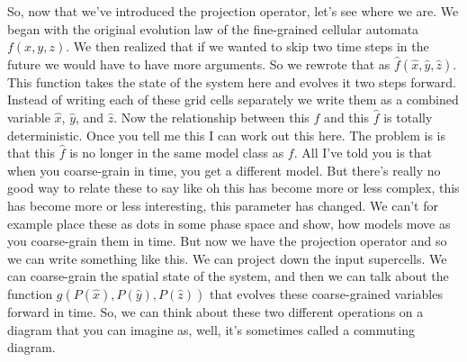 \documentclass[]{article}
\begin{document}
So, now that we've introduced the projection operator, let's see where we are.
We began with the original evolution law of the fine-grained cellular automata $f(x, y, z)$.
We then realized that if we wanted to skip two time steps in the future we would have to have more arguments.
So we rewrote that as $\hat{f}(\hat{x},\hat{y},\hat{z})$.
This function takes the state of the system here and evolves it two steps forward.
Instead of writing each of these grid cells separately we write them as a combined variable $\hat{x}$, $\hat{y}$, and $\hat{z}$.
Now the relationship between this $f$ and this $\hat{f}$  is totally deterministic.
Once you tell me this I can work out this here.
The problem is is that this $\hat{f}$ is no longer in the same model class as $f$.
All I've told you is that when you coarse-grain in time, you get a different model.
But there's really no good way to relate these to say like oh this has become more or less complex, this has become more or less interesting,
this parameter has changed. We can't for example place these as dots in some phase space and show, how models move as you coarse-grain them in time.
But now we have the projection operator and so we can write something like this.
We can project down the input supercells.
We can coarse-grain the spatial state of the system, and then we can talk about
the function $g(P(\hat{x}), P(\hat{y}), P(\hat{z}))$ that evolves these coarse-grained variables forward in time.
So, we can think about these two different operations on a diagram that you can imagine as, well, it's sometimes called a commuting diagram.
\end{document}
